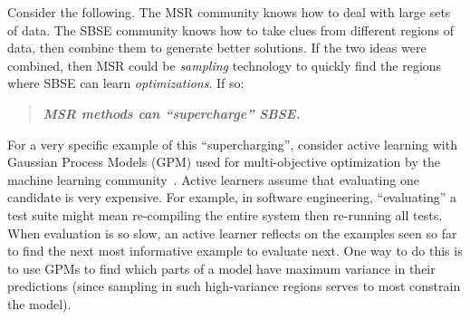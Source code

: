 \documentclass[sigconf,anonymous,review]{acmart}
\begin{document}








Consider the following. The MSR
community knows how to deal with large sets of data. The SBSE community knows how to take
clues from different regions of data, then combine them to generate better solutions.
If the two ideas were combined, then  MSR could be  {\em sampling} technology to quickly
find the regions where SBSE  can learn {\em  optimizations}. If so:
\begin{quote}
\centering
{\bf {\em   MSR  methods can ``supercharge''    SBSE.}}
\end{quote}
For a very specific example of this ``supercharging'', consider active learning
with Gaussian Process Models (GPM) used for multi-objective optimization
by the machine learning community~\cite{zuluaga2016varepsilon}.  Active learners assume that evaluating one candidate
is very expensive. For example, in software engineering, ``evaluating'' a test suite
might mean re-compiling
the entire system then re-running all tests. When evaluation is so slow,
an active learner reflects on the examples seen so far to find the next most informative
example to evaluate next. One way to do this is to use GPMs  to
find which parts of a model have maximum variance in their predictions 
(since sampling
in such high-variance regions serves to most constrain the model).  
\end{document}
